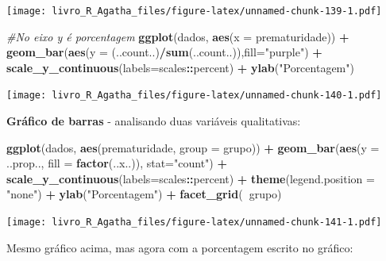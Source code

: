 \documentclass[
]{book}
\newenvironment{Shaded}{\begin{snugshade}}{\end{snugshade}}
\newcommand{\CommentTok}[1]{\textcolor[rgb]{0.56,0.35,0.01}{\textit{#1}}}
\newcommand{\DataTypeTok}[1]{\textcolor[rgb]{0.13,0.29,0.53}{#1}}
\newcommand{\KeywordTok}[1]{\textcolor[rgb]{0.13,0.29,0.53}{\textbf{#1}}}
\newcommand{\NormalTok}[1]{#1}
\newcommand{\OperatorTok}[1]{\textcolor[rgb]{0.81,0.36,0.00}{\textbf{#1}}}
\newcommand{\StringTok}[1]{\textcolor[rgb]{0.31,0.60,0.02}{#1}}
\begin{document}
\texttt{[image: livro\_R\_Agatha\_files/figure-latex/unnamed-chunk-139-1.pdf]}

\begin{Shaded}
\begin{Highlighting}[]
\CommentTok{#No eixo y é porcentagem}
\KeywordTok{ggplot}\NormalTok{(dados, }\KeywordTok{aes}\NormalTok{(}\DataTypeTok{x =}\NormalTok{ prematuridade)) }\OperatorTok{+}\StringTok{  }
\StringTok{  }\KeywordTok{geom_bar}\NormalTok{(}\KeywordTok{aes}\NormalTok{(}\DataTypeTok{y =}\NormalTok{ (..count..)}\OperatorTok{/}\KeywordTok{sum}\NormalTok{(..count..)),}\DataTypeTok{fill=}\StringTok{"purple"}\NormalTok{) }\OperatorTok{+}\StringTok{ }
\StringTok{  }\KeywordTok{scale_y_continuous}\NormalTok{(}\DataTypeTok{labels=}\NormalTok{scales}\OperatorTok{::}\NormalTok{percent) }\OperatorTok{+}
\StringTok{  }\KeywordTok{ylab}\NormalTok{(}\StringTok{"Porcentagem"}\NormalTok{)}
\end{Highlighting}
\end{Shaded}

\texttt{[image: livro\_R\_Agatha\_files/figure-latex/unnamed-chunk-140-1.pdf]}

\textbf{Gráfico de barras} - analisando duas variáveis qualitativas:

\begin{Shaded}
\begin{Highlighting}[]
\KeywordTok{ggplot}\NormalTok{(dados, }\KeywordTok{aes}\NormalTok{(prematuridade, }\DataTypeTok{group =}\NormalTok{ grupo)) }\OperatorTok{+}\StringTok{ }
\StringTok{  }\KeywordTok{geom_bar}\NormalTok{(}\KeywordTok{aes}\NormalTok{(}\DataTypeTok{y =}\NormalTok{ ..prop.., }\DataTypeTok{fill =} \KeywordTok{factor}\NormalTok{(..x..)), }\DataTypeTok{stat=}\StringTok{"count"}\NormalTok{) }\OperatorTok{+}\StringTok{ }
\StringTok{  }\KeywordTok{scale_y_continuous}\NormalTok{(}\DataTypeTok{labels=}\NormalTok{scales}\OperatorTok{::}\NormalTok{percent) }\OperatorTok{+}
\StringTok{  }\KeywordTok{theme}\NormalTok{(}\DataTypeTok{legend.position =} \StringTok{"none"}\NormalTok{) }\OperatorTok{+}
\StringTok{  }\KeywordTok{ylab}\NormalTok{(}\StringTok{"Porcentagem"}\NormalTok{) }\OperatorTok{+}
\StringTok{  }\KeywordTok{facet_grid}\NormalTok{(}\OperatorTok{~}\NormalTok{grupo)}
\end{Highlighting}
\end{Shaded}

\texttt{[image: livro\_R\_Agatha\_files/figure-latex/unnamed-chunk-141-1.pdf]}

Mesmo gráfico acima, mas agora com a porcentagem escrito no gráfico:
\end{document}

